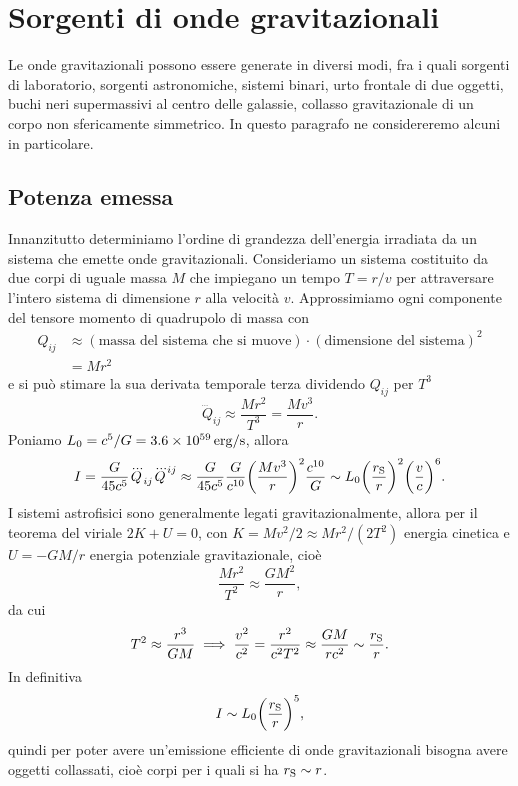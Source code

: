\section{Sorgenti di onde gravitazionali}
\label{sec:sorgenti-onde-grav}

Le onde gravitazionali possono essere generate in diversi modi, fra i quali
sorgenti di laboratorio, sorgenti astronomiche, sistemi binari, urto frontale di
due oggetti, buchi neri supermassivi al centro delle galassie, collasso
gravitazionale di un corpo non sfericamente simmetrico.  In questo paragrafo ne
considereremo alcuni in particolare.

\subsection{Potenza emessa}
\label{sec:potenza-emessa}

Innanzitutto determiniamo l'ordine di grandezza dell'energia irradiata da un
sistema che emette onde gravitazionali.  Consideriamo un sistema costituito da
due corpi di uguale massa $M$ che impiegano un tempo $T = r/v$ per attraversare
l'intero sistema di dimensione $r$ alla velocità $v$.  Approssimiamo ogni
componente del tensore momento di quadrupolo di massa con
\begin{equation}
  \begin{split}
    Q_{ij} &\approx (\text{massa del sistema che si muove}) \cdot
    (\text{dimensione del sistema})^{2} \\
    &= M r^{2}
  \end{split}
\end{equation}
e si può stimare la sua derivata temporale terza dividendo $Q_{ij}$ per $T^{3}$
\begin{equation}
  \dddot{Q}_{ij} \approx \frac{Mr^{2}}{T^{3}} = \frac{Mv^{3}}{r}.
\end{equation}
Poniamo $L_{0} = c^{5}/G = \SI{3.6e59}{erg\per\second}$, allora
\begin{equation}
  I = \frac{G}{45c^{5}} \dddot{Q}_{ij} \dddot{Q}^{ij} \approx \frac{G}{45c^{5}}
  \frac{G}{c^{10}} \bigg(\frac{M v^{3}}{r}\bigg)^{2} \frac{c^{10}}{G} \sim
  L_{0} \bigg(\frac{r_{\textup{S}}}{r}\bigg)^{2} \bigg(\frac{v}{c}\bigg)^{6}.
\end{equation}
I sistemi astrofisici sono generalmente legati gravitazionalmente, allora per il
teorema del viriale $2K + U = 0$, con $K = Mv^{2}/2 \approx M r^{2}/(2T^{2})$
energia cinetica e $U = -GM/r$ energia potenziale gravitazionale, cioè
\begin{equation}
  \frac{Mr^{2}}{T^{2}} \approx \frac{GM^{2}}{r},
\end{equation}
da cui
\begin{equation}
  T^{2} \approx \frac{r^{3}}{GM} \implies \frac{v^{2}}{c^{2}} =
  \frac{r^{2}}{c^{2}T^{2}} \approx \frac{GM}{rc^{2}} \sim
  \frac{r_{\textup{S}}}{r}.
\end{equation}
In definitiva
\begin{equation}
  I \sim L_{0} \bigg(\frac{r_{\textup{S}}}{r}\bigg)^{5},
\end{equation}
quindi per poter avere un'emissione efficiente di onde gravitazionali bisogna
avere oggetti collassati, cioè corpi per i quali si ha $r_{\textup{S}} \sim r$.

